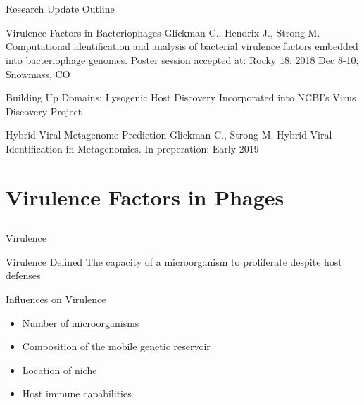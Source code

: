 \documentclass[11pt, xcolor=table]{beamer}
\begin{document}
	

\section{}
	\begin{frame}{Research Update Outline}
	\begin{block}{Virulence Factors in Bacteriophages}
	\tiny{Glickman C., Hendrix J., Strong M. Computational identification and analysis of bacterial virulence factors embedded into bacteriophage genomes. Poster session accepted at: Rocky 18: 2018 Dec 8-10; Snowmass, CO}
	\end{block}
	
	\begin{block}{\textcolor{black!50}{Building Up Domains: Lysogenic Host Discovery}}
  \textcolor{black!50}{Incorporated into NCBI's Virus Discovery Project}
	\end{block}

	\begin{block}{\textcolor{black!50}{Hybrid Viral Metagenome Prediction}}
	\textcolor{black!50}{\tiny{Glickman C., Strong M. Hybrid Viral Identification in Metagenomics. In preperation: Early 2019}}
	\end{block}
	\end{frame}
\section{Virulence Factors in Phages}
\subsection{}
	
	\begin{frame}{Virulence}
		\begin{block}{Virulence Defined}
		The capacity of a microorganism to proliferate despite host defenses
		\end{block}
		
		\begin{block}{Influences on Virulence}
		\begin{itemize}
		\item Number of microorganisms
		\item \alert{Composition of the mobile genetic reservoir}
		\item Location of niche
		\item Host immune capabilities
		\end{itemize}
		\end{block}
	
	\end{frame}
\end{document}
